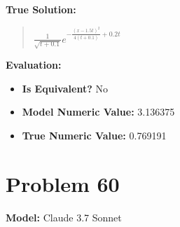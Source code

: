 \documentclass{article}
\begin{document}
\textbf{True Solution:}
\begin{quote}
$\frac{1}{\sqrt{t+0.1}} e^{-\frac{(x-1.5t)^2}{4(t+0.1)} + 0.2t}$
\end{quote}

\textbf{Evaluation:}
\begin{itemize}
\item \textbf{Is Equivalent?} No
\item \textbf{Model Numeric Value:} 3.136375
\item \textbf{True Numeric Value:} 0.769191
\end{itemize}
\vspace{1cm}
\section*{Problem 60}
\textbf{Model:} Claude 3.7 Sonnet
\end{document}
